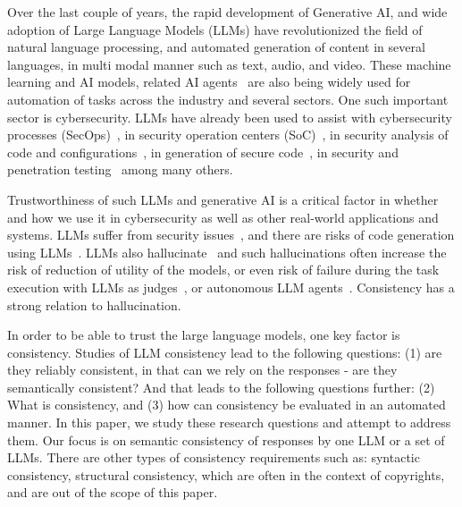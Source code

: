 Over the last couple of years, the rapid development of Generative AI, and wide adoption of Large Language Models (LLMs) have revolutionized the field of natural language processing, and automated  generation of content in several languages, in  multi modal manner such as text, audio, and video. These machine learning and AI models, related AI agents~\cite{talebirad2023multi} are also being widely used for automation of tasks across the industry and several sectors. One such important sector is cybersecurity. LLMs have already been used to assist with cybersecurity processes (SecOps)~\cite{gennari2024considerations}, in security operation centers (SoC)~\cite{saha2024llm}, in security analysis of code and configurations~\cite{toth2024llms, minna2024analyzing}, in generation of secure code~\cite{vaidya2023critical,saha2024empowering}, in security and penetration testing~\cite{song2024poster} among many others. 

Trustworthiness of such LLMs and generative AI is a critical factor in whether and how we use it in cybersecurity as well as other real-world applications and systems. LLMs suffer from security issues~\cite{wu2024new,qachfar2024all}, and there are risks of code generation using LLMs~\cite{vaidya2023critical}. LLMs also hallucinate~\cite{xu2024hallucination} and such hallucinations often increase the risk of reduction of utility of the models, or even risk of failure during the task execution with LLMs as judges~\cite{zheng2024judging}, or autonomous LLM agents~\cite{talebirad2023multi}. Consistency has a strong relation to hallucination. 

In order to be able to trust the large language models, one key factor is consistency.  Studies of LLM consistency lead to the following questions:  (1) are they reliably consistent, in that can we rely on the responses - are they semantically consistent? And that leads to the following questions further: (2) What is consistency, and (3) how can consistency be evaluated in an automated manner. In this paper, we study these research questions and attempt to address them. Our focus is on semantic consistency of responses by one LLM or a set of LLMs. There are other types of consistency requirements such as: syntactic consistency, structural consistency, which are often in the context of copyrights, and are out of the scope of this paper. 

